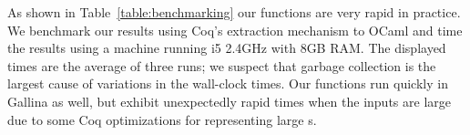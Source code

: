 As shown in Table~\ref{table:benchmarking} our functions are very rapid in practice.
We benchmark our results using Coq's extraction mechanism to OCaml and time the 
results using a machine running i5 2.4GHz with 8GB RAM.  The displayed times are
the average of three runs; we suspect that garbage collection is the largest cause 
of variations in the wall-clock times.  Our functions run quickly
in Gallina as well, but exhibit unexpectedly rapid times when the inputs are large
due to some Coq optimizations for representing large s.


